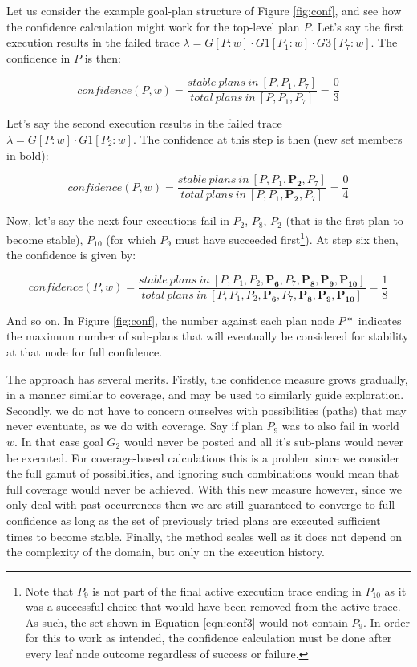 \documentclass[a4paper]{article}
\begin{document}
Let us consider the example goal-plan structure of Figure \ref{fig:conf}, and see how the confidence calculation might work for the top-level plan $P$. Let's say the first execution results in the failed trace $\lambda=G[P:w] \cdot G1[P_1:w] \cdot G3[P_7:w]$. The confidence in $P$ is then:

\begin{equation}
confidence(P,w)=\frac{stable~plans~in~[P,P_1,P_7]}{total~plans~in~[P,P_1,P_7]} = \frac{0}{3}
\end{equation}

Let's say the second execution results in the failed trace $\lambda=G[P:w] \cdot G1[P_2:w]$. The confidence at this step is then (new set members in bold):

\begin{equation}
confidence(P,w)=\frac{stable~plans~in~[P,P_1,\boldsymbol{P_2},P_7]}{total~plans~in~[P,P_1,\boldsymbol{P_2},P_7]} = \frac{0}{4}
\end{equation}

Now, let's say the next four executions fail in $P_2$, $P_8$, $P_2$ (that is the first plan to become stable), $P_{10}$ (for which $P_9$ must have succeeded first\footnote{Note that $P_9$ is not part of the final active execution trace ending in $P_{10}$ as it was a successful choice that would have been removed from the active trace. As such, the set shown in Equation \ref{eqn:conf3} would not contain $P_9$. In order for this to work as intended, the confidence calculation must be done after every leaf node outcome regardless of success or failure.}). At step six then, the confidence is given by:

\begin{equation}
confidence(P,w)=\frac{stable~plans~in~[P,P_1,P_2, \boldsymbol{P_6},P_7,\boldsymbol{P_8},\boldsymbol{P_9},\boldsymbol{P_{10}}]}{total~plans~in~[P,P_1,P_2, \boldsymbol{P_6},P_7,\boldsymbol{P_8},\boldsymbol{P_9},\boldsymbol{P_{10}}]} = \frac{1}{8}
\label{eqn:conf3}
\end{equation}

And so on. In Figure \ref{fig:conf}, the number against each plan node $P*$ indicates the maximum number of sub-plans that will eventually be considered for stability at that node for full confidence. 

The approach has several merits. Firstly, the confidence measure grows gradually, in a manner similar to coverage, and may be used to similarly guide exploration. Secondly, we do not have to concern ourselves with possibilities (paths) that may never eventuate, as we do with coverage. Say if plan $P_9$ was to also fail in world $w$. In that case goal $G_2$ would never be posted and all it's sub-plans would never be executed. For coverage-based calculations this is a problem since we consider the full gamut of possibilities, and ignoring such combinations would mean that full coverage would never be achieved. With this new measure however, since we only deal with past occurrences then we are still guaranteed to converge to full confidence as long as the set of previously tried plans are executed sufficient times to become stable. Finally, the method scales well as it does not depend on the complexity of the domain, but only on the execution history.
\end{document}
